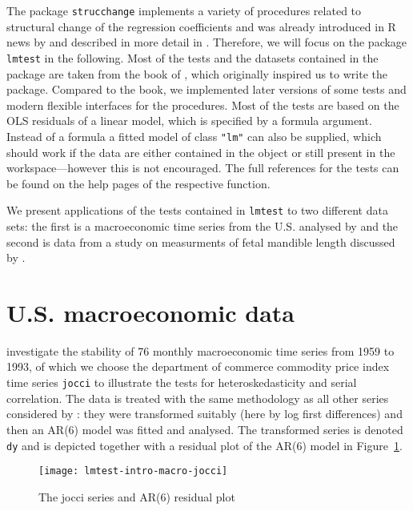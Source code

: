 \documentclass[a4paper]{article}
\begin{document}
The package \texttt{strucchange} implements a variety of procedures related
to structural change of the regression coefficients and was already
introduced in \textsf{R} news by \cite{lmtest:Zeileis:2001} and described in more
detail in \cite{lmtest:Zeileis+Leisch+Hornik:2002}. Therefore, we will focus on
the package \texttt{lmtest} in the following. Most of the tests and the datasets contained in the package
are taken from the book of \cite{lmtest:Kraemer+Sonnberger:1986}, which originally
inspired us to write the package. Compared to the book, we implemented later
versions of some tests and modern flexible interfaces for the procedures.
Most of the tests are based on the OLS residuals of a linear model, which is
specified by a formula argument. Instead of a formula a fitted model of class
\verb/"lm"/ can also be supplied, which should work if the data are either
contained in the object or still present in the workspace---however this is
not encouraged. The full references for the tests can be found on the help pages
of the respective function.

We present applications of the tests contained in \texttt{lmtest} to two different
data sets: the first is a macroeconomic time series from the U.S.
analysed by \cite{lmtest:Stock+Watson:1996} and the second is data from a
study on measurments of fetal mandible length discussed by \cite{lmtest:Royston+Altman:1994}.

\section{U.S. macroeconomic data} \label{sec:macro}

\cite{lmtest:Stock+Watson:1996}
investigate the stability of 76 monthly macroeconomic time series
from 1959 to 1993, of which we choose
the department of commerce commodity price index time series \texttt{jocci}
to illustrate the tests for heteroskedasticity and serial correlation.
The data is treated with the same methodology as all other series considered
by \cite{lmtest:Stock+Watson:1996}: they were transformed suitably (here by
log first differences) and then an AR(6) model was fitted and analysed.
The transformed series is denoted \texttt{dy} and is depicted
together with a residual plot of the AR(6) model in Figure~\ref{macro-jocci}.

\begin{figure}[htbp]
\begin{center}
\texttt{[image: lmtest-intro-macro-jocci]}
\caption{\label{macro-jocci} The jocci series and AR(6) residual plot}
\end{center}
\end{figure}
\end{document}
